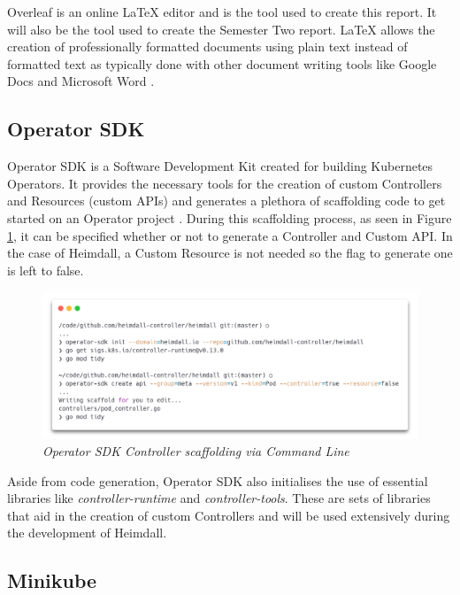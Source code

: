 \documentclass{article}
\begin{document}
Overleaf is an online LaTeX editor and is the tool used to create this report. It will also be the tool used to create the Semester Two report. LaTeX allows the creation of professionally formatted documents using plain text instead of formatted text as typically done with other document writing tools like Google Docs and Microsoft Word \cite{overleaf}.


\subsection{Operator SDK} \label{osdk}

Operator SDK is a Software Development Kit created for building Kubernetes Operators. It provides the necessary tools for the creation of custom Controllers and Resources (custom APIs) and generates a plethora of scaffolding code to get started on an Operator project \cite{osdk-overview}. During this scaffolding process, as seen in Figure \ref{osdk-img}, it can be specified whether or not to generate a Controller and Custom API. In the case of Heimdall, a Custom Resource is not needed so the flag to generate one is left to false.

\begin{figure}[H]
    \centering
    \includegraphics[width=160mm]{tools/osdk.png}
    \caption{\emph{Operator SDK Controller scaffolding via Command Line}}
    \label{osdk-img}
\end{figure}

Aside from code generation, Operator SDK also initialises the use of essential libraries like \emph{controller-runtime} and \emph{controller-tools}. These are sets of libraries that aid in the creation of custom Controllers and will be used extensively during the development of Heimdall.


\subsection{Minikube}
\end{document}
